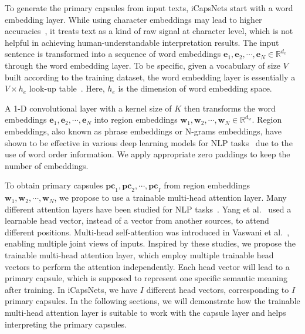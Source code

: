 \documentclass[10pt,journal,compsoc]{IEEEtran}
\begin{document}

To generate the primary capsules from input texts, iCapsNets start with a word embedding layer. While using character embeddings may lead to higher accuracies~\cite{zhang2015character}, it treats text as a kind of raw signal at character level, which is not helpful in achieving human-understandable interpretation results. The input sentence is transformed into a sequence of word embeddings $\mathbf{e}_1, \mathbf{e}_2, \cdots, \mathbf{e}_N \in \mathbb{R}^{d_e}$ through the word embedding layer. To be specific, given a vocabulary of size $V$ built according to the training dataset, the word embedding layer is essentially a $V \times h_e$ look-up table~\cite{collobert2011natural}. Here, $h_e$ is the dimension of word embedding space.


A 1-D convolutional layer with a kernel size of $K$ then transforms the word embeddings $\mathbf{e}_1, \mathbf{e}_2, \cdots, \mathbf{e}_N$ into region embeddings $\mathbf{w}_1, \mathbf{w}_2, \cdots, \mathbf{w}_N \in \mathbb{R}^{d_w}$. Region embeddings, also known as phrase embeddings or N-grams embeddings, have shown to be effective in various deep learning models for NLP tasks~\cite{wang2018learning,johnson2015effective,johnson2015semi,johnson2017deep,kim2014convolutional} due to the use of word order information. We apply appropriate zero paddings to keep the number of embeddings.


To obtain primary capsules $\mathbf{pc}_1, \mathbf{pc}_2, \cdots, \mathbf{pc}_I$ from region embeddings $\mathbf{w}_1, \mathbf{w}_2, \cdots, \mathbf{w}_N$, we propose to use a trainable multi-head attention layer. Many different attention layers have been studied for NLP tasks~\cite{bahdanau2014neural,vaswani2017attention,yang2016hierarchical,wu2016google}. Yang et al.~\cite{yang2016hierarchical} used a learnable head vector, instead of a vector from another sources, to attend different positions. Multi-head self-attention was introduced in Vaswani et al.~\cite{vaswani2017attention}, enabling multiple joint views of inputs. Inspired by these studies, we propose the trainable multi-head attention layer, which employ multiple trainable head vectors to perform the attention independently. Each head vector will lead to a primary capsule, which is supposed to represent one specific semantic meaning after training. In iCapsNets, we have $I$ different head vectors, corresponding to $I$ primary capsules. In the following sections, we will demonstrate how the trainable multi-head attention layer is suitable to work with the capsule layer and helps interpreting the primary capsules.
\end{document}
